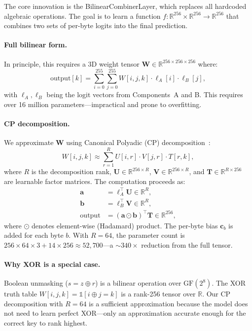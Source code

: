 \documentclass[submission]{iacrtrans}
\newcommand{\GF}{\mathrm{GF}}
\begin{document}
The core innovation is the BilinearCombinerLayer, which replaces all hardcoded algebraic operations. The goal is to learn a function $f: \mathbb{R}^{256} \times \mathbb{R}^{256} \to \mathbb{R}^{256}$ that combines two sets of per-byte logits into the final prediction.

\paragraph{Full bilinear form.} In principle, this requires a 3D weight tensor $\bm{W} \in \mathbb{R}^{256 \times 256 \times 256}$ where:
\begin{equation}
  \text{output}[k] = \sum_{i=0}^{255} \sum_{j=0}^{255} W[i,j,k] \cdot \ell_A[i] \cdot \ell_B[j],
\end{equation}
with $\ell_A, \ell_B$ being the logit vectors from Components~A and B. This requires over 16 million parameters---impractical and prone to overfitting.

\paragraph{CP decomposition.} We approximate $\bm{W}$ using Canonical Polyadic (CP) decomposition~\cite{kolda2009tensor}:
\begin{equation}\label{eq:cp}
  W[i,j,k] \approx \sum_{r=1}^{R} U[i,r] \cdot V[j,r] \cdot T[r,k],
\end{equation}
where $R$ is the decomposition rank, $\bm{U} \in \mathbb{R}^{256 \times R}$, $\bm{V} \in \mathbb{R}^{256 \times R}$, and $\bm{T} \in \mathbb{R}^{R \times 256}$ are learnable factor matrices. The computation proceeds as:
\begin{align}
  \bm{a} &= \bm{\ell}_A^\top \bm{U} \in \mathbb{R}^R, \label{eq:step1}\\
  \bm{b} &= \bm{\ell}_B^\top \bm{V} \in \mathbb{R}^R, \label{eq:step2}\\
  \text{output} &= (\bm{a} \odot \bm{b})^\top \bm{T} \in \mathbb{R}^{256}, \label{eq:step3}
\end{align}
where $\odot$ denotes element-wise (Hadamard) product. The per-byte bias $\bm{c}_b$ is added for each byte $b$. With $R = 64$, the parameter count is $256 \times 64 \times 3 + 14 \times 256 \approx 52{,}700$---a $\sim\!340\times$ reduction from the full tensor.

\paragraph{Why XOR is a special case.} Boolean unmasking ($s = z \oplus r$) is a bilinear operation over $\GF(2^8)$. The XOR truth table $W[i,j,k] = \mathbb{1}[i \oplus j = k]$ is a rank-256 tensor over $\mathbb{R}$. Our CP decomposition with $R = 64$ is a sufficient approximation because the model does not need to learn perfect XOR---only an approximation accurate enough for the correct key to rank highest.
\end{document}
